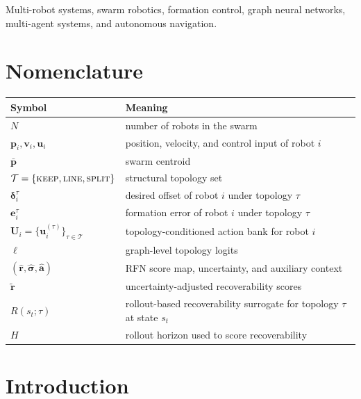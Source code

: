 \documentclass{ieeeaccess}
\newcommand{\cT}{\mathcal{T}}
\newcommand{\bfu}{\mathbf{u}}
\newcommand{\bfp}{\mathbf{p}}
\newcommand{\bfv}{\mathbf{v}}
\newcommand{\bfe}{\mathbf{e}}
\begin{document}
\begin{keywords}
Multi-robot systems, swarm robotics, formation control, graph neural networks, multi-agent systems, and autonomous navigation.
\end{keywords}

\maketitle

\section*{Nomenclature}
\begingroup\footnotesize
\begin{center}
\begin{tabular}{p{}p{}}
\toprule
\textbf{Symbol} & \textbf{Meaning} \\
\midrule
$N$ & number of robots in the swarm \\
$\bfp_i,\bfv_i,\bfu_i$ & position, velocity, and control input of robot $i$ \\
$\bar{\bfp}$ & swarm centroid \\
$\cT=\{\textsc{keep},\textsc{line},\textsc{split}\}$ & structural topology set \\
$\bm{\delta}_i^\tau$ & desired offset of robot $i$ under topology $\tau$ \\
$\bfe_i^\tau$ & formation error of robot $i$ under topology $\tau$ \\
$\mathbf{U}_i=\{\bfu_i^{(\tau)}\}_{\tau\in\cT}$ & topology-conditioned action bank for robot $i$ \\
$\bm{\ell}$ & graph-level topology logits \\
$(\hat{\mathbf{r}},\hat{\bm{\sigma}},\hat{\mathbf{a}})$ & RFN score map, uncertainty, and auxiliary context \\
$\tilde{\mathbf{r}}$ & uncertainty-adjusted recoverability scores \\
$R(s_t;\tau)$ & rollout-based recoverability surrogate for topology $\tau$ at state $s_t$ \\
$H$ & rollout horizon used to score recoverability \\
\bottomrule
\end{tabular}
\end{center}
\endgroup

\section{Introduction}
\label{sec:intro}
\end{document}
